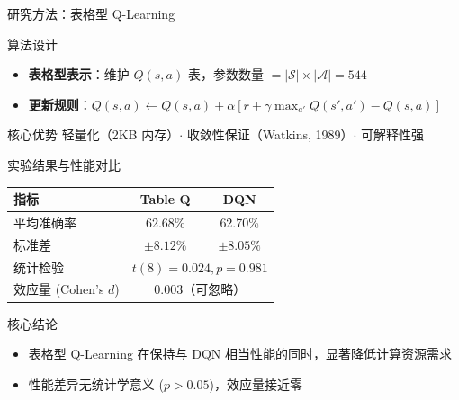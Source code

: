 {\begin{frame}{研究方法：表格型 Q-Learning}
    \begin{block}{算法设计}
        \begin{itemize}
            \item \textbf{表格型表示}：维护 $Q(s,a)$ 表，参数数量 $=|\mathcal{S}|\times|\mathcal{A}|=544$
            \item \textbf{更新规则}：$Q(s,a) \leftarrow Q(s,a) + \alpha[r + \gamma\max_{a'}Q(s',a') - Q(s,a)]$
        \end{itemize}
    \end{block}

    \begin{block}{核心优势}
        轻量化（2KB 内存）$\cdot$ 收敛性保证（Watkins, 1989）$\cdot$ 可解释性强
    \end{block}
\end{frame}

\begin{frame}{实验结果与性能对比}
    \begin{center}
    \renewcommand{\arraystretch}{1.4}
    \begin{tabular}{lcc}
        \hline
        \textbf{指标} & \textbf{Table Q} & \textbf{DQN} \\
        \hline
        平均准确率 & 62.68\% & 62.70\% \\
        标准差 & $\pm 8.12\%$ & $\pm 8.05\%$ \\
        统计检验 & \multicolumn{2}{c}{$t(8) = 0.024, p = 0.981$} \\
        效应量 (Cohen's $d$) & \multicolumn{2}{c}{$0.003$（可忽略）} \\
        \hline

    \end{tabular}
    \end{center}

    \begin{block}{核心结论}
        \begin{itemize}
            \item 表格型 Q-Learning 在保持与 DQN 相当性能的同时，显著降低计算资源需求
            \item 性能差异无统计学意义 ($p > 0.05$)，效应量接近零
        \end{itemize}
    \end{block}
\end{frame}

}
